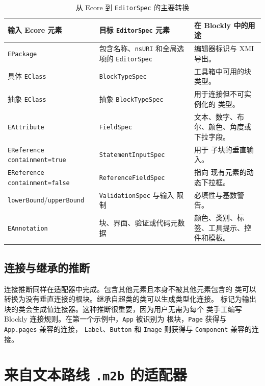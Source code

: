 \begin{table}[H]
  \centering
  \small
  \begin{tabular}{|L{0.30\textwidth}|L{0.30\textwidth}|L{0.26\textwidth}|}
    \hline
    输入 Ecore 元素 & 目标 \texttt{EditorSpec} 元素 & 在 Blockly 中的用途 \\
    \hline
    \texttt{EPackage} & 包含名称、\texttt{nsURI} 和全局选项的
    \texttt{EditorSpec} & 编辑器标识与 XMI 导出。 \\
    具体 \texttt{EClass} & \texttt{BlockTypeSpec} & 工具箱中可用的块类型。 \\
    抽象 \texttt{EClass} & 抽象 \texttt{BlockTypeSpec} & 用于连接但不可实例化的
    类型。 \\
    \texttt{EAttribute} & \texttt{FieldSpec} & 文本、数字、布尔、颜色、角度或
    下拉字段。 \\
    \texttt{EReference containment=true} & \texttt{StatementInputSpec} & 用于
    子块的垂直输入。 \\
    \texttt{EReference containment=false} & \texttt{ReferenceFieldSpec} & 指向
    现有元素的动态下拉框。 \\
    \texttt{lowerBound}/\texttt{upperBound} & \texttt{ValidationSpec} 与输入
    限制 & 必填性与基数警告。 \\
    \texttt{EAnnotation} & 块、界面、验证或代码元数据 &
    颜色、类别、标签、工具提示、控件和模板。 \\
    \hline
  \end{tabular}
  \caption{从 Ecore 到 \texttt{EditorSpec} 的主要转换}
  \label{tab:transformacion-ecore-editor-spec}
\end{table}

\subsection{连接与继承的推断}

连接推断同样在适配器中完成。包含其他元素且本身不被其他元素包含的
类可以转换为没有垂直连接的根块。继承自超类的类可以生成类型化连接。
标记为输出块的类会生成值连接器。这种推断很重要，因为用户无需为每个
类手工编写 Blockly 连接规则。在第一个示例中，\texttt{App} 被识别为
根块，\texttt{Page} 获得与 \texttt{App.pages} 兼容的连接，
\texttt{Label}、\texttt{Button} 和 \texttt{Image} 则获得与
\texttt{Component} 兼容的连接。

\section{来自文本路线 \texttt{.m2b} 的适配器}
\label{sec:implementacion-domainmodel-adapter}

